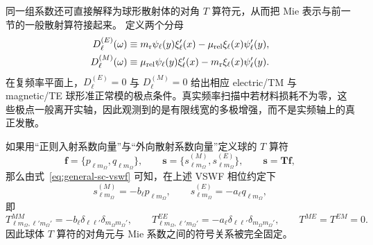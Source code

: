 同一组系数还可直接解释为球形散射体的对角 $T$ 算符元，从而把 Mie 表示与前一节的一般散射算符接起来。
定义两个分母
\begin{align}
D_\ell^{(E)}(\omega)
&\equiv
m_{\rm r}\psi_\ell(y)\xi_\ell'(x)
-\mu_{\rm rel}\xi_\ell(x)\psi_\ell'(y),
\\
D_\ell^{(M)}(\omega)
&\equiv
\mu_{\rm rel}\psi_\ell(y)\xi_\ell'(x)
-m_{\rm r}\xi_\ell(x)\psi_\ell'(y).
\label{eq:mie-resonance-denominators}
\end{align}
在复频率平面上，$D_\ell^{(E)}=0$ 与
$D_\ell^{(M)}=0$ 给出相应 electric/TM 与 magnetic/TE 球形准正常模的极点条件。真实频率扫描中若材料损耗不为零，这些极点一般离开实轴，因此观测到的是有限线宽的多极增强，而不是实频轴上的真正发散。

如果用“正则入射系数向量”与“外向散射系数向量”定义球的 $T$ 算符
\begin{equation}
\bm f
=\{p_{\ell m_{\Omega}},q_{\ell m_{\Omega}}\},
\qquad
\bm s
=\{s_{\ell m_{\Omega}}^{(M)},s_{\ell m_{\Omega}}^{(E)}\},
\qquad
\bm s=\mathbf T\bm f,
\end{equation}
那么由式~\eqref{eq:general-sc-vswf} 可知，在上述 VSWF 相位约定下
\begin{equation}
\boxed{
s_{\ell m_{\Omega}}^{(M)}=-b_\ell p_{\ell m_{\Omega}},
\qquad
s_{\ell m_{\Omega}}^{(E)}=-a_\ell q_{\ell m_{\Omega}},}
\label{eq:mie-T-diagonal}
\end{equation}
即
\begin{equation}
T_{\ell m_{\Omega},\ell' m_{\Omega}'}^{MM}
=-b_\ell\delta_{\ell\ell'}\delta_{m_{\Omega}m_{\Omega}'},
\qquad
T_{\ell m_{\Omega},\ell' m_{\Omega}'}^{EE}
=-a_\ell\delta_{\ell\ell'}\delta_{m_{\Omega}m_{\Omega}'},
\qquad
T^{ME}=T^{EM}=0.
\end{equation}
因此球体 $T$ 算符的对角元与 Mie 系数之间的符号关系被完全固定。


